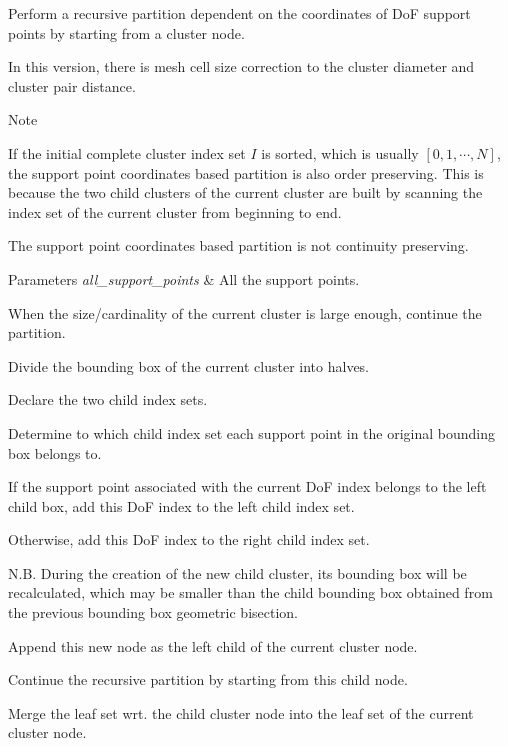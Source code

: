 Perform a recursive partition dependent on the coordinates of DoF support points by starting from a cluster node.

In this version, there is mesh cell size correction to the cluster diameter and cluster pair distance.


\begin{DoxyDescription}
\item[Note ]
\begin{DoxyEnumerate}
\item If the initial complete cluster index set $I$ is sorted, which is usually $[0, 1, \cdots, N]$, the support point coordinates based partition is also order preserving. This is because the two child clusters of the current cluster are built by scanning the index set of the current cluster from beginning to end.
\item The support point coordinates based partition is not continuity preserving.  
\end{DoxyEnumerate}
\end{DoxyDescription}


\begin{DoxyParams}{Parameters}
{\em all\+\_\+support\+\_\+points} & All the support points. \\
\hline
\end{DoxyParams}
When the size/cardinality of the current cluster is large enough, continue the partition.

Divide the bounding box of the current cluster into halves.

Declare the two child index sets.

Determine to which child index set each support point in the original bounding box belongs to.

If the support point associated with the current DoF index belongs to the left child box, add this DoF index to the left child index set.

Otherwise, add this DoF index to the right child index set.

N.\+B. During the creation of the new child cluster, its bounding box will be recalculated, which may be smaller than the child bounding box obtained from the previous bounding box geometric bisection.

Append this new node as the left child of the current cluster node.

Continue the recursive partition by starting from this child node.

Merge the leaf set wrt. the child cluster node into the leaf set of the current cluster node.

